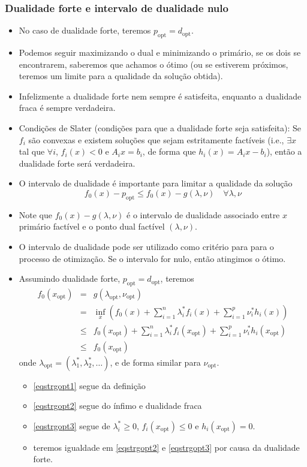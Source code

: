 \begin{frame}[allowframebreaks]
  \frametitle{Dualidade forte e intervalo de dualidade nulo}
  \begin{itemize}
  \item No caso de dualidade forte, teremos $p_{\text{opt}} = d_{\text{opt}}$.
  \item Podemos seguir maximizando o dual e minimizando o primário, se os dois se encontrarem,
	saberemos que achamos o ótimo (ou se estiverem próximos, teremos um limite para a qualidade
	da solução obtida).
  \item Infelizmente a dualidade forte nem sempre é satisfeita, enquanto a dualidade fraca é sempre verdadeira.
  \item Condições de Slater (condições para que a dualidade forte seja satisfeita):
	Se $f_i$ são convexas e existem soluções que sejam estritamente factíveis 
	(i.e., $\exists x$ tal que $\forall i$, $f_i(x) < 0$ e $A_i x = b_i$, de forma que
	$h_i(x) = A_i x - b_i$), então a dualidade forte será verdadeira.
  \item O intervalo de dualidade é importante para limitar a qualidade da solução
	\begin{equation}
	f_0 (x) - p_{\text{opt}} \leq f_0 (x) - g(\lambda, \nu) \quad \forall \lambda, \nu
	\end{equation}
  \item Note que $f_0 (x) - g(\lambda, \nu)$ é o intervalo de dualidade associado entre $x$ primário
	factível e o ponto dual factível $(\lambda, \nu)$.
  \item O intervalo de dualidade pode ser utilizado como critério para para o processo de otimização.
	Se o intervalo for nulo, então atingimos o ótimo.
  \item Assumindo dualidade forte, $p_{\text{opt}} = d_{\text{opt}}$, teremos
	\begin{eqnarray}
	f_0(x_{\text{opt}}) &=& g(\lambda_{\text{opt}}, \nu_{\text{opt}}) \\
			&=& \inf_x \left( f_0(x) + \sum_{i=1}^{n} \lambda_i^\ast f_i (x) + \sum_{i=1}^{p} \nu_i^\ast h_i(x) \right) \label{eqstrgopt1} \\	
			&\leq& f_0(x_{\text{opt}}) + \sum_{i=1}^{n} \lambda_i^\ast f_i (x_{\text{opt}}) + \sum_{i=1}^{p} \nu_i^\ast h_i(x_{\text{opt}}) \label{eqstrgopt2} \\
			&\leq& f_0(x_{\text{opt}}) \label{eqstrgopt3}
	\end{eqnarray}
	onde $\lambda_{\text{opt}} = (\lambda_1^\ast , \lambda_2^\ast, \ldots)$, e  de forma similar para $\nu_{\text{opt}}$.
	\begin{itemize}
	\item \ref{eqstrgopt1} segue da definição
	\item \ref{eqstrgopt2} segue do ínfimo e dualidade fraca
	\item \ref{eqstrgopt3} segue de $\lambda_i^\ast \geq 0$, $f_i(x_{\text{opt}}) \leq 0$ e $h_i(x_{\text{opt}}) = 0$.
	\item teremos igualdade em \ref{eqstrgopt2} e \ref{eqstrgopt3} por causa da dualidade forte.
	\end{itemize}



\end{itemize}
\end{frame}
